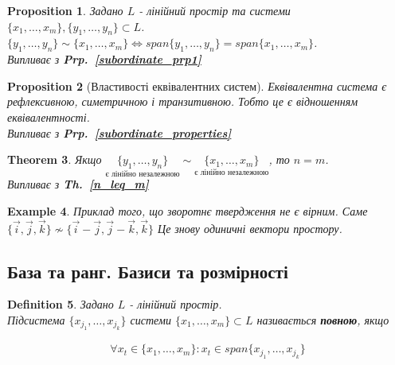 \documentclass[a4paper, 10pt]{article}
\theoremstyle{theoremdd}
\newtheorem{theorem}{Theorem}[subsection]
\newtheorem{definition}[theorem]{Definition}
\newtheorem{example}[theorem]{Example}
\newtheorem{proposition}[theorem]{Proposition}
\newcommand\thref[1]{\textbf{Th.~\ref{#1}}}
\newcommand\prpref[1]{\textbf{Prp.~\ref{#1}}}
\begin{document}
	\begin{proposition}
	Задано $L$ - лінійний простір та системи $\{x_1,\dots,x_m\}, \{y_1,\dots,y_n\} \subset L$.\\
	$\{y_1, \dots, y_n \} \sim \{x_1, \dots, x_m \} \iff span \{y_1, \dots, y_n\} = span \{x_1, \dots, x_m \}$.\\
	\textit{Випливає з} \prpref{subordinate_prp1}
	\end{proposition}
	
	\begin{proposition}[Властивості еквівалентних систем]
	Еквівалентна система є рефлексивною, симетричною і транзитивною. Тобто це є відношенням еквівалентності.\\
	\textit{Випливає з} \prpref{subordinate_properties}
	\end{proposition}
	
	\begin{theorem}
	Якщо $\underset{\textrm{є лінійно незалежною}}{\{y_1, \dots, y_n \}} \sim \underset{\textrm{є лінійно незалежною}}{\{x_1, \dots, x_m \}} $, то $n = m$.\\
	\textit{Випливає з} \thref{n_leq_m}
	\end{theorem}
	
	\begin{example}
	Приклад того, що зворотнє твердження не є вірним. Саме $\{\vec{i},\vec{j},\vec{k}\} \not\sim \{\vec{i}-\vec{j}, \vec{j}-\vec{k}, \vec{k} \}$ Це знову одиничні вектори простору.
	\end{example}
	
	\subsection{База та ранг. Базиси та розмірності}
	\begin{definition}
	Задано $L$ - лінійний простір.\\
	Підсистема $\{x_{j_1}, \dots, x_{j_k}\}$ системи $\{x_1, \dots, x_m\} \subset L$ називається \textbf{повною}, якщо
	\iffalse
	\begin{align*}
	\forall x_t \in \{x_1, \dots, x_m\}: \exists \alpha^1_t, \dots, \alpha^k_t: x_t = \alpha^1_t x_{j_1} + \dots + \alpha^k_t x_{j_k}
	\end{align*}
	\fi
	\begin{align*}
	\forall x_t \in \{x_1,\dots,x_m\}: x_t \in span\{x_{j_1},\dots,x_{j_k}\}
	\end{align*}
	\end{definition}
	
\end{document}

